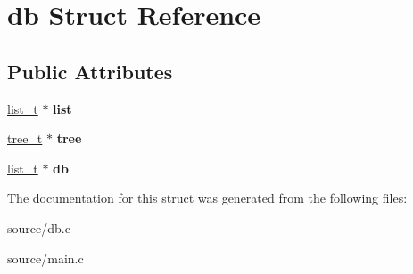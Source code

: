 \hypertarget{structdb}{}\section{db Struct Reference}
\label{structdb}
\subsection*{Public Attributes}
\begin{DoxyCompactItemize}
\item 
\hyperlink{list_8h_a15376354e4e8b4f1732e9df17f30786c}{list\+\_\+t} $\ast$ {\bfseries list}\hypertarget{structdb_a5fedea3155ef053369fdfb28d36127de}{}\label{structdb_a5fedea3155ef053369fdfb28d36127de}

\item 
\hyperlink{tree_8h_aabd08cfd7893b1b0d401ce689de8c1b7}{tree\+\_\+t} $\ast$ {\bfseries tree}\hypertarget{structdb_a5d36e66fa7c1813d47d3894ba39c7c4c}{}\label{structdb_a5d36e66fa7c1813d47d3894ba39c7c4c}

\item 
\hyperlink{list_8h_a15376354e4e8b4f1732e9df17f30786c}{list\+\_\+t} $\ast$ {\bfseries db}\hypertarget{structdb_a9d1c94548a90d6fd205612a8a46e3bd0}{}\label{structdb_a9d1c94548a90d6fd205612a8a46e3bd0}

\end{DoxyCompactItemize}


The documentation for this struct was generated from the following files\+:\begin{DoxyCompactItemize}
\item 
source/db.\+c\item 
source/main.\+c\end{DoxyCompactItemize}
